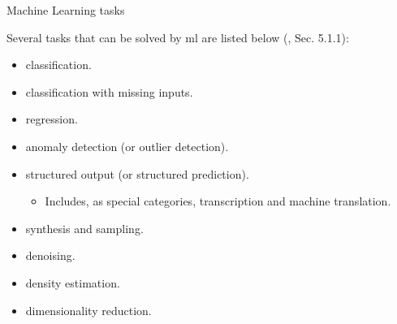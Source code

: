 

\begin{frame}[t]{Machine Learning tasks}

    Several tasks that can be solved by 
    \gls{ml} are listed below 
    (\cite{Goodfellow:2017MITDL}, Sec. 5.1.1):\\
    \vspace{0.2cm}
    \begin{itemize}
        \item
        \Gls{classification}.\\
        \vspace{0.1cm}
        \item
        \Gls{classification} with missing inputs.\\
        \vspace{0.1cm}
        \item
        \Gls{regression}.\\
        \vspace{0.1cm}
        \item
        \Gls{anomaly detection}
        (or \gls{outlier detection}).\\
        \vspace{0.1cm}
        \item
        \Gls{structured output}
        (or \gls{structured prediction}).\\
        \vspace{0.1cm}
        \begin{itemize}
            \item
            Includes, as special categories,
            \gls{transcription}
            and
            machine \gls{translation}.\\
            \vspace{0.1cm}
        \end{itemize}
        \item
        \Gls{synthesis and sampling}.\\
        \vspace{0.1cm}
        \item
        \Gls{denoising}.\\
        \vspace{0.1cm}
        \item
        \Gls{density estimation}.\\
        \vspace{0.1cm}
        \item
        \Gls{dimensionality reduction}.\\
    \end{itemize}


\end{frame}

